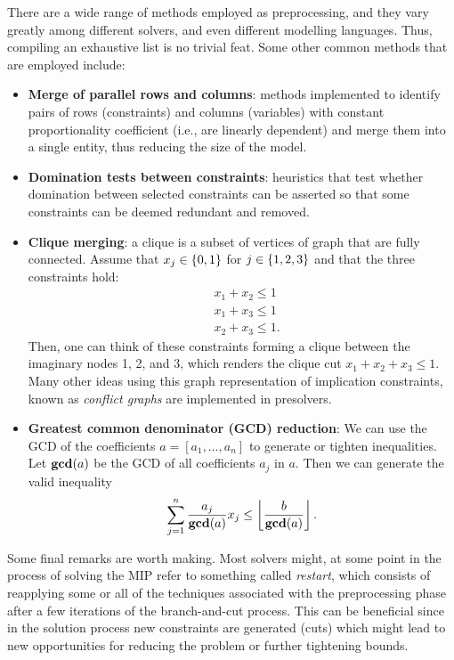 There are a wide range of methods employed as preprocessing, and they vary greatly among different solvers, and even different modelling languages. Thus, compiling an exhaustive list is no trivial feat. Some other common methods that are employed include:
\begin{itemize}
	\item {\bf Merge of parallel rows and columns}: methods implemented to identify pairs of rows (constraints) and columns (variables) with constant proportionality coefficient (i.e., are linearly dependent) and merge them into a single entity, thus reducing the size of the model.
	\item {\bf Domination tests between constraints}: heuristics that test whether domination between selected constraints can be asserted so that some constraints can be deemed redundant and removed. 
	\item {\bf Clique merging}: a clique is a subset of vertices of graph that are fully connected. Assume that $x_j \in \left\{ 0,1 \right \}$ for $j \in \left\{ 1,2,3 \right \}$ and that the three constraints hold:
	\begin{align*}
		& x_1 + x_2 \le 1 \\
		& x_1 + x_3 \le 1 \\
		& x_2 + x_3 \le 1.
	\end{align*}
	Then, one can think of these constraints forming a clique between the imaginary nodes 1, 2, and 3, which renders the clique cut $x_1 + x_2 + x_3 \le 1$. Many other ideas using this graph representation of implication constraints, known as \emph{conflict graphs} are implemented in presolvers.
	\item {\bf Greatest common denominator (GCD) reduction}: We can use the GCD of the coefficients $a = [a_1, \dots, a_n]$ to generate or tighten inequalities. Let $\text{{\bf gcd}}(a)$ be the GCD of all coefficients $a_j$ in $a$. Then we can generate the valid inequality
	\begin{equation*}
		\sum_{j=1}^n\frac{a_j}{\text{{\bf gcd}}(a)} x_j\leq \left\lfloor\frac{b}{\text{{\bf gcd}}(a)}\right \rfloor.
	\end{equation*}
\end{itemize}

 
Some final remarks are worth making. Most solvers might, at some point in the process of solving the MIP refer to something called \emph{restart}, which consists of reapplying some or all of the techniques associated with the preprocessing phase after a few iterations of the branch-and-cut process. This can be beneficial since in the solution process new constraints are generated (cuts) which might lead to new opportunities for reducing the problem or further tightening bounds.

